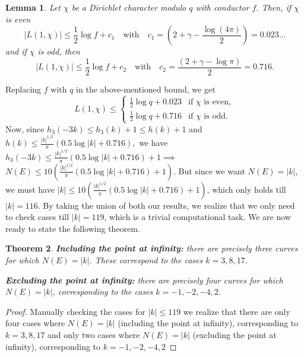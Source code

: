 \documentclass[12pt]{amsart}
\theoremstyle{plain}
\newtheorem{thm}{Theorem}
\newtheorem{lemma}[thm]{Lemma}
\theoremstyle{definition}
\theoremstyle{remark}
\numberwithin{equation}{section}
\numberwithin{thm}{section}
\theoremstyle{named}
\theoremstyle{named}
\begin{document}
\begin{lemma}\label{Louboutin}
    Let $\chi$ be a Dirichlet character modulo $q$ with conductor $f$. Then, if $\chi$ is even
\[
|L(1,\chi)| \leq \frac{1}{2}\log f + c_1 \quad \text{with} \quad c_1 = \left(2 + \gamma - \frac{\log(4\pi)}{2}\right) = 0.023\ldots 
\]  and if $\chi$ is odd, then \[
|L(1,\chi)| \leq \frac{1}{2}\log f + c_2 \quad \text{with} \quad c_2 = \frac{\left(2 + \gamma - \log \pi \right)}{2} = 0.716.
\]

\end{lemma}Replacing $f$ with $q$ in the above-mentioned bound, we get \begin{equation*}
L(1, \chi) \leq 
\begin{cases} 
\frac{1}{2} \log q + 0.023 & \text{if $\chi$ is even}, \\
\frac{1}{2} \log q + 0.716 & \text{if $\chi$ is odd}.
\end{cases}
\end{equation*}
Now, since $h_3(-3k) \le h_3(k) + 1 \le h(k) + 1$ and $h(k) \le \frac{|k|^{1/2}}{\pi}(0.5 \log |k| +0.716),$ we have $h_3(-3k) \le \frac{|k|^{1/2}}{\pi}(0.5 \log |k| +0.716) + 1 \implies$ $N(E) \le 10 \left( \frac{|k|^{1/2}}{\pi}(0.5 \log |k| +0.716) + 1 \right).$ But since we want $N(E) = |k|$, we must have $|k| \le 10 \left( \frac{|k|^{1/2}}{\pi}(0.5 \log |k| +0.716) + 1 \right)$, which only holds till $|k| =116$. By taking the union of both our results, we realize that we only need to check cases till $|k| = 119$, which is a trivial computational task. We are now ready to state the following theorem. 
\begin{thm}
   \item \textbf{{Including the point at infinity:} }there are precisely three curves for which $N(E) = |k|$. These correspond to the cases $k =3, 8, 17$.
    \item \textbf{{Excluding the point at infinity:}} there are precisely four curves for which $N(E) = |k|$, corresponding to the cases  $k = -1, -2, -4, 2$.
\end{thm}

\begin{proof}
Manually checking the cases for $|k| \le 119$ we realize that there are only four cases where $N(E) = |k|$ (including the point at infinity), corresponding to $k = 3, 8, 17$ and only two cases where $N(E) = |k|$ (excluding the point at infinity), corresponding to $k = -1, -2, -4, 2$
\end{proof}
\end{document}
